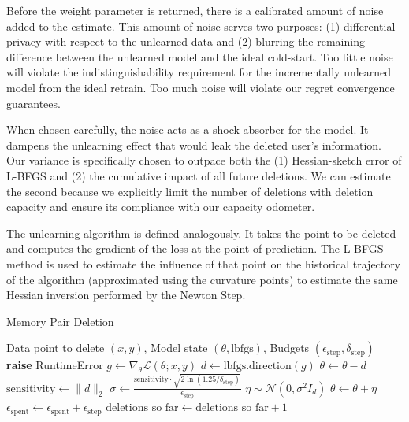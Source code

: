 \documentclass[a4paper,12pt]{article}
\begin{document}
Before the weight parameter is returned, there is a calibrated amount of noise added to the estimate. This amount of noise serves two purposes: (1) differential privacy with respect to the unlearned data and (2) blurring the remaining difference between the unlearned model and the ideal cold-start. Too little noise will violate the indistinguishability requirement for the incrementally unlearned model from the ideal retrain. Too much noise will violate our regret convergence guarantees.

When chosen carefully, the noise acts as a shock absorber for the model. It dampens the unlearning effect that would leak the deleted user's information. Our variance is specifically chosen to outpace both the (1) Hessian-sketch error of L-BFGS and (2) the cumulative impact of all future deletions. We can estimate the second because we explicitly limit the number of deletions with deletion capacity and ensure its compliance with our capacity odometer.

The unlearning algorithm is defined analogously. It takes the point to be deleted and computes the gradient of the loss at the point of prediction. The L-BFGS method is used to estimate the influence of that point on the historical trajectory of the algorithm (approximated using the curvature points) to estimate the same Hessian inversion performed by the Newton Step.

\begin{algorithm}
\caption{Memory Pair Deletion}\label{alg:deletion}
\begin{algorithmic}
\Require Data point to delete $(x, y)$, Model state $(\theta, \text{lbfgs})$, Budgets $(\epsilon_{\text{step}}, \delta_{\text{step}})$
\State \textbf{raise} RuntimeError
\EndIf
\State
\State $g \gets \nabla_{\theta} \mathcal{L}(\theta; x, y)$
\State $d \gets \text{lbfgs.direction}(g)$
\State $\theta \gets \theta - d$
\State
\State $\text{sensitivity} \gets \|d\|_{2}$
\State $\sigma \gets \frac{\text{sensitivity} \cdot \sqrt{2 \ln(1.25 / \delta_{\text{step}})}}{\epsilon_{\text{step}}}$
\State $\eta \sim \mathcal{N}(0, \sigma^{2} I_{d})$
\State $\theta \gets \theta + \eta$
\State
\State $\epsilon_{\text{spent}} \gets \epsilon_{\text{spent}} + \epsilon_{\text{step}}$
\State $\text{deletions so far} \gets \text{deletions so far} + 1$

\end{algorithmic}
\end{algorithm}
\end{document}
